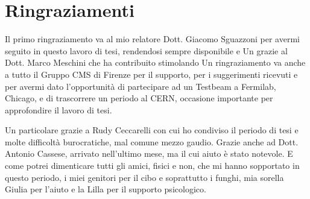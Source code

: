 \chapter*{Ringraziamenti}
\thispagestyle{empty}
Il primo ringraziamento va al mio relatore Dott. Giacomo Sguazzoni per avermi seguito in questo lavoro di tesi, rendendosi sempre disponibile e 
Un grazie al Dott. Marco Meschini che ha contribuito stimolando  
Un ringraziamento va anche a tutto il Gruppo CMS di Firenze per il supporto, per i suggerimenti ricevuti e per avermi dato l'opportunità di partecipare ad un Testbeam a Fermilab, Chicago, e di trascorrere un periodo al CERN, occasione importante per approfondire il lavoro di tesi.

Un particolare grazie a Rudy Ceccarelli con cui ho condiviso il periodo di tesi e molte difficoltà burocratiche, mal comune mezzo gaudio. Grazie anche ad Dott. Antonio Cassese, arrivato nell'ultimo mese, ma il cui aiuto è stato notevole.
E come potrei dimenticare tutti gli amici, fisici e non, che mi hanno sopportato in questo periodo, 
i miei genitori per il cibo e soprattutto i funghi, mia sorella Giulia per l'aiuto e la Lilla per il supporto psicologico.